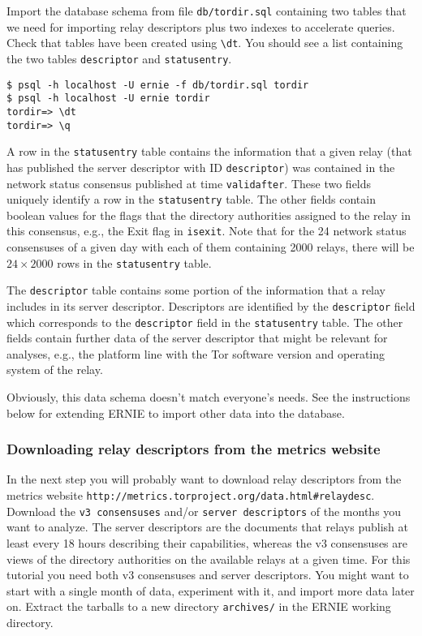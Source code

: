 \documentclass{article}
\begin{document}
Import the database schema from file \verb+db/tordir.sql+ containing two
tables that we need for importing relay descriptors plus two indexes to
accelerate queries. Check that tables have been created using \verb+\dt+.
You should see a list containing the two tables \verb+descriptor+ and
\verb+statusentry+.

\begin{verbatim}
$ psql -h localhost -U ernie -f db/tordir.sql tordir
$ psql -h localhost -U ernie tordir
tordir=> \dt
tordir=> \q
\end{verbatim}

A row in the \verb+statusentry+ table contains the information that a
given relay (that has published the server descriptor with ID
\verb+descriptor+) was contained in the network status consensus published
at time \verb+validafter+.
These two fields uniquely identify a row in the \verb+statusentry+ table.
The other fields contain boolean values for the flags that the directory
authorities assigned to the relay in this consensus, e.g., the Exit flag
in \verb+isexit+.
Note that for the 24 network status consensuses of a given day with each
of them containing 2000 relays, there will be $24 \times 2000$ rows in the
\verb+statusentry+ table.

The \verb+descriptor+ table contains some portion of the information that
a relay includes in its server descriptor.
Descriptors are identified by the \verb+descriptor+ field which
corresponds to the \verb+descriptor+ field in the \verb+statusentry+
table.
The other fields contain further data of the server descriptor that might
be relevant for analyses, e.g., the platform line with the Tor software
version and operating system of the relay.

Obviously, this data schema doesn't match everyone's needs.
See the instructions below for extending ERNIE to import other data into
the database.

\subsubsection{Downloading relay descriptors from the metrics website}

In the next step you will probably want to download relay descriptors from
the metrics website
\verb+http://metrics.torproject.org/data.html#relaydesc+.
Download the \verb+v3 consensuses+ and/or \verb+server descriptors+ of the
months you want to analyze.
The server descriptors are the documents that relays publish at least
every 18 hours describing their capabilities, whereas the v3 consensuses
are views of the directory authorities on the available relays at a given
time.
For this tutorial you need both v3 consensuses and server descriptors.
You might want to start with a single month of data, experiment with it,
and import more data later on.
Extract the tarballs to a new directory \verb+archives/+ in the ERNIE
working directory.
\end{document}
